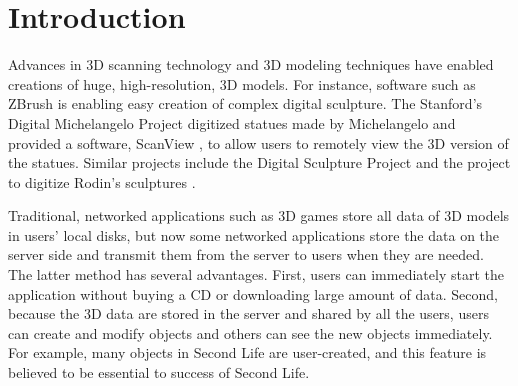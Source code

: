 \documentclass[11pt, a4paper]{report}
\begin{document}
\begin{abstract}

\end{abstract}
\chapter{Introduction}
\label{c:intro}
    Advances in 3D scanning technology and 3D modeling
    techniques have enabled creations of huge,
    high-resolution, 3D models.  
    For instance, software such as
    ZBrush is enabling easy creation of complex digital sculpture.
    The Stanford's Digital Michelangelo Project
    \cite{levoy00digital} digitized statues made by Michelangelo
    and provided a software, ScanView \cite{koller04protected},
    to allow users to remotely view the 3D version of the statues.
    Similar projects include the Digital Sculpture Project \cite{deroos2004dsp}
    and the project to digitize Rodin's sculptures \cite{miyazaki2006dab}. 

    Traditional, networked applications such as 3D games 
    store all data of 3D models in users’ local disks, 
    but now some networked applications store the data on the server side 
    and transmit them from the server to users when they are needed. 
    The latter method has several advantages. 
    First, users can immediately start the application without buying a CD
    or downloading large amount of data. 
    Second, because the 3D data are stored in the server and shared by all the users, 
    users can create and modify objects and others can see the new objects immediately. 
    For example, many objects in Second Life are user-created, 
    and this feature is believed to be essential to success of Second Life. 
\end{document}
